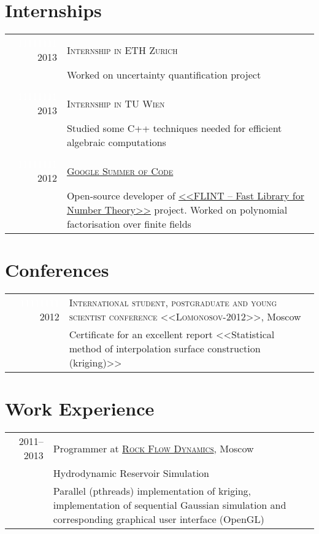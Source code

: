 \documentclass[a4paper,10pt]{article}
\begin{document}
\section{Internships}
\begin{tabular}{r|p{13cm}}
  \textcolor{white}{11111111} 2013 & \textsc{Internship in ETH Zurich} \\
 & \footnotesize Worked on uncertainty quantification project\\
  
 \multicolumn{2}{c}{} \\

\textcolor{white}{11111111} 2013 & \textsc{Internship in TU Wien} \\
 & \footnotesize Studied some C++ techniques needed for efficient algebraic computations\\
  
 \multicolumn{2}{c}{} \\

 \textcolor{white}{11111111} 2012 & 
 \href{https://google-melange.appspot.com/gsoc/project/google/gsoc2012/kulakova_lina/26001}{\textsc{Google Summer of Code}}\\
 & \footnotesize{Open-source developer of
 \href{https://github.com/lina-kulakova/flint2}{<<FLINT -- Fast Library for Number Theory>>} project.
 Worked on polynomial factorisation over finite fields}
 
\end{tabular}

\section{Conferences}
\begin{tabular}{r|p{13cm}}
 \textcolor{white}{11111111} 2012 & \textsc{International student, postgraduate and young scientist conference
 <<Lomonosov-2012>>}, Moscow\\
 & \footnotesize{Certificate for an excellent report <<Statistical method of interpolation surface construction (kriging)>>}
\end{tabular}

\section{Work Experience}
\begin{tabular}{r|p{13cm}}
 \textcolor{white}{1} 2011--2013 & Programmer at \href{http://rfdyn.com/}{\textsc{Rock Flow Dynamics}}, Moscow \\
 & Hydrodynamic Reservoir Simulation\\
 & \footnotesize {Parallel (pthreads) implementation of
 kriging, implementation of sequential Gaussian simulation and corresponding graphical user interface (OpenGL)} \\
\end{tabular}
\end{document}
